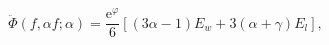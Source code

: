 \begin{equation}
\ddot\Phi(f,\alpha f;\alpha)
   = \frac{\mathrm{e}^\varphi}{6}
     \left[  \left( 3\alpha-1
             \right) E_w
           +3\left( \alpha+\gamma
             \right) E_l
     \right],
\end{equation}

